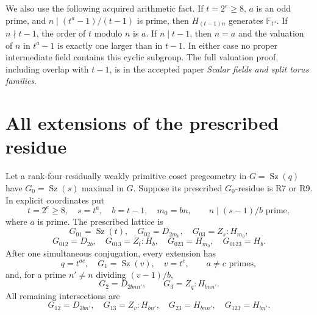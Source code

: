 \documentclass[11pt,a4paper]{article}
\newcommand{\Sz}{\operatorname{Sz}}\newcommand{\F}{\mathbb F}
\begin{document}
We also use the following acquired arithmetic fact. If $t=2^e\ge8$,
$a$ is an odd prime, and $n\mid(t^a-1)/(t-1)$ is prime, then
$H_{(t-1)n}$ generates $\F_{t^a}$. If $n\nmid t-1$, the order of
$t$ modulo $n$ is $a$. If $n\mid t-1$, then $n=a$ and the valuation
of $n$ in $t^a-1$ is exactly one larger than in $t-1$. In either case
no proper intermediate field contains this cyclic subgroup. The full
valuation proof, including overlap with $t-1$, is in the accepted
paper \emph{Scalar fields and split torus families}.

\section{All extensions of the prescribed residue}
\begin{theorem}\label{extension}
Let a rank-four residually weakly primitive coset pregeometry in
$G=\Sz(q)$ have $G_0=\Sz(s)$ maximal in $G$. Suppose its prescribed
$G_0$-residue is R7 or R9. In explicit coordinates put
\[
 t=2^e\ge8,\quad s=t^a,\quad b=t-1,\quad m_0=bn,
 \qquad n\mid(s-1)/b\text{ prime},
\]
where $a$ is prime. The prescribed lattice is
\[
 G_{01}=\Sz(t),\quad G_{02}=D_{2m_0},\quad G_{03}=Z_s:H_{m_0},
\]
\[
 G_{012}=D_{2b},\quad G_{013}=Z_t:H_b,\quad
 G_{023}=H_{m_0},\quad G_{0123}=H_b.
\]
After one simultaneous conjugation, every extension has
\[
 q=t^{ac},\quad G_1=\Sz(v),\quad v=t^c,
 \qquad a\ne c\text{ primes},
\]
and, for a prime $n'\ne n$ dividing $(v-1)/b$,
\[
 G_2=D_{2bnn'},\qquad G_3=Z_q:H_{bnn'}.
\]
All remaining intersections are
\[
 G_{12}=D_{2bn'},\quad G_{13}=Z_v:H_{bn'},\quad
 G_{23}=H_{bnn'},\quad G_{123}=H_{bn'}.
\]
\end{theorem}
\end{document}
